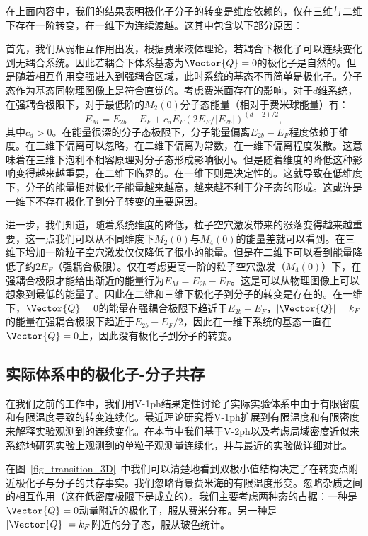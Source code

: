 在上面内容中，我们的结果表明极化子分子的转变是维度依赖的，仅在三维与二维下存在一阶转变，在一维下为连续渡越。这其中包含以下部分原因：

首先，我们从弱相互作用出发，根据费米液体理论，若耦合下极化子可以连续变化到无耦合系统。因此若耦合下体系基态为$\Vector{Q}=0$的极化子是自然的。但是随着相互作用变强进入到强耦合区域，此时系统的基态不再简单是极化子。分子态作为基态同物理图像上是符合直觉的。考虑费米面存在的影响，对于$d$维系统，在强耦合极限下，对于最低阶的$M_2(0)$分子态能量（相对于费米球能量）有\cite{Zollner2011Polarons}：
\begin{equation}
E_M=E_{2b}-E_F+c_d E_F(2E_F/|E_{2b}|)^{(d-2)/2},
\end{equation}
其中$c_d>0$。在能量很深的分子态极限下，分子能量偏离$E_{2b}-E_F$程度依赖于维度。在三维下偏离可以忽略，在二维下偏离为常数，在一维下偏离程度发散。这意味着在三维下泡利不相容原理对分子态形成影响很小。但是随着维度的降低这种影响变得越来越重要，在二维下临界的。在一维下则是决定性的。这就导致在低维度下，分子的能量相对极化子能量越来越高，越来越不利于分子态的形成。这或许是一维下不存在极化子到分子转变的重要原因。

进一步，我们知道，随着系统维度的降低，粒子空穴激发带来的涨落变得越来越重要，这一点我们可以从不同维度下$M_2(0)$与$M_4(0)$的能量差就可以看到。在三维下增加一阶粒子空穴激发仅仅降低了很小的能量。但是在二维下可以看到能量降低了约$2E_F$（强耦合极限）。仅在考虑更高一阶的粒子空穴激发（$M_4(0)$）下，在强耦合极限才能给出渐近的能量行为$E_M=E_{2b}-E_F$。这是可以从物理图像上可以想象到最低的能量了。因此在二维和三维下极化子到分子的转变是存在的。在一维下，$\Vector{Q}=0$的能量在强耦合极限下趋近于$E_{2b}-E_F$，$|\Vector{Q}|=k_F$的能量在强耦合极限下趋近于$E_{2b}-E_F/2$，因此在一维下系统的基态一直在$\Vector{Q}=0$上，因此没有极化子到分子的转变。

\subsection{实际体系中的极化子-分子共存}
在我们之前的工作中\cite{Cui2020Fermi}，我们用V-1ph结果定性讨论了实际实验体系中由于有限密度和有限温度导致的转变连续化。最近理论研究\cite{Parish2021thermodynamic}将V-1ph扩展到有限温度和有限密度来解释实验观测到的连续变化。在本节中我们基于V-2ph以及考虑局域密度近似来系统地研究实验上观测到的单粒子观测量连续化，并与最近的实验做详细对比\cite{Sagi2020}。

在图~\ref{fig_transition_3D}~中我们可以清楚地看到双极小值结构决定了在转变点附近极化子与分子的共存事实。我们忽略背景费米海的有限温度形变。忽略杂质之间的相互作用（这在低密度极限下是成立的）。我们主要考虑两种态的占据：一种是$\Vector{Q}=0$动量附近的极化子，服从费米分布。另一种是$|\Vector{Q}|=k_F$附近的分子态，服从玻色统计。

